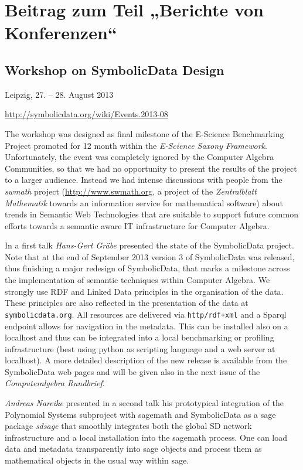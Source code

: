 \documentclass{article}
\begin{document}
\section*{\centering Beitrag zum Teil „Berichte von Konferenzen“}

\subsection*{Workshop on SymbolicData Design}

Leipzig, 27. -- 28. August 2013

\url{http://symbolicdata.org/wiki/Events.2013-08}

The workshop was designed as final milestone of the E-Science Benchmarking
Project promoted for 12 month within the \emph{E-Science Saxony Framework}.
Unfortunately, the event was completely ignored by the Computer Algebra
Communities, so that we had no opportunity to present the results of the
project to a larger audience.  Instead we had intense discussions with people
from the \emph{swmath} project (\url{http://www.swmath.org}, a project of the
\emph{Zentralblatt Mathematik} towards an information service for mathematical
software) about trends in Semantic Web Technologies that are suitable to
support future common efforts towards a semantic aware IT infrastructure for
Computer Algebra.

In a first talk \emph{Hans-Gert Gräbe} presented the state of the SymbolicData
project.  Note that at the end of September 2013 version 3 of SymbolicData was
released, thus finishing a major redesign of SymbolicData, that marks a
milestone across the implementation of semantic techniques within Computer
Algebra.  We strongly use RDF and Linked Data principles in the organisation
of the data. These principles are also reflected in the presentation of the
data at \texttt{symbolicdata.org}. All resources are delivered via
\texttt{http/rdf+xml} and a Sparql endpoint allows for navigation in the
metadata. This can be installed also on a localhost and thus can be integrated
into a local benchmarking or profiling infrastructure (best using python as
scripting language and a web server at localhost). A more detailed description
of the new release is available from the SymbolicData web pages and will be
given also in the next issue of the \emph{Computeralgebra Rundbrief}.

\emph{Andreas Nareike} presented in a second talk his prototypical integration
of the Polynomial Systems subproject with sagemath and SymbolicData as a sage
package \emph{sdsage} that smoothly integrates both the global SD network
infrastructure and a local installation into the sagemath process. One can
load data and metadata transparently into sage objects and process them as
mathematical objects in the usual way within sage. 
\end{document}

